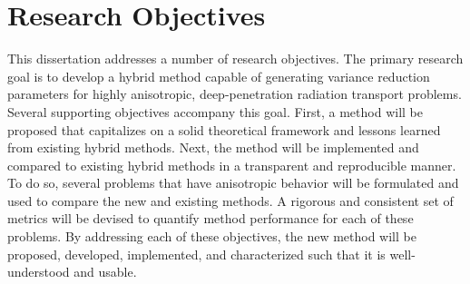 \section{Research Objectives}
\label{sec:objectives}

This dissertation addresses a number of research objectives. The
primary research goal is to develop a hybrid method capable of generating
variance reduction parameters for highly anisotropic,
deep-penetration radiation transport
problems. Several supporting objectives accompany this goal. First, a
method will be proposed that capitalizes on a solid theoretical framework
and lessons learned from existing hybrid methods.
Next, the method will be implemented and compared to
existing hybrid methods in a transparent and reproducible manner. To do so,
several problems that have anisotropic behavior will be formulated and used to
compare the new and existing methods. A rigorous and consistent set of metrics
will be devised to quantify method performance for each of these problems. By
addressing each of these objectives, the new method will be
proposed, developed, implemented, and characterized such that it is
well-understood and usable.

